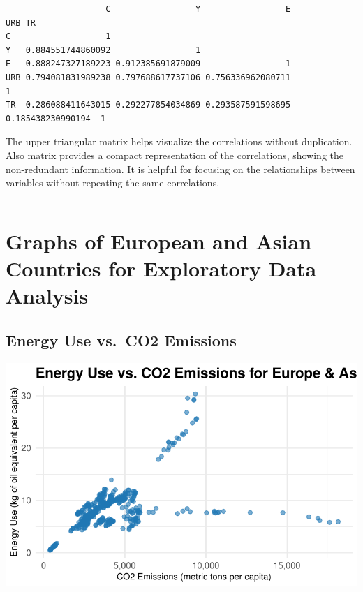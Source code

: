 \documentclass[
  11pt,
]{article}
\begin{document}
\begin{verbatim}
                    C                 Y                 E               URB TR
C                   1                                                         
Y   0.884551744860092                 1                                       
E   0.888247327189223 0.912385691879009                 1                     
URB 0.794081831989238 0.797688617737106 0.756336962080711                 1   
TR  0.286088411643015 0.292277854034869 0.293587591598695 0.185438230990194  1
\end{verbatim}

The upper triangular matrix helps visualize the correlations without
duplication. Also matrix provides a compact representation of the
correlations, showing the non-redundant information. It is helpful for
focusing on the relationships between variables without repeating the
same correlations.

\begin{center}\rule{0.5\linewidth}{0.5pt}\end{center}

\hypertarget{graphs-of-european-and-asian-countries-for-exploratory-data-analysis}{%
\section{Graphs of European and Asian Countries for Exploratory Data
Analysis}\label{graphs-of-european-and-asian-countries-for-exploratory-data-analysis}}

\subsection{Energy Use vs.~CO2 Emissions}

\includegraphics{Report_files/figure-pdf/unnamed-chunk-21-1.pdf}
\end{document}
